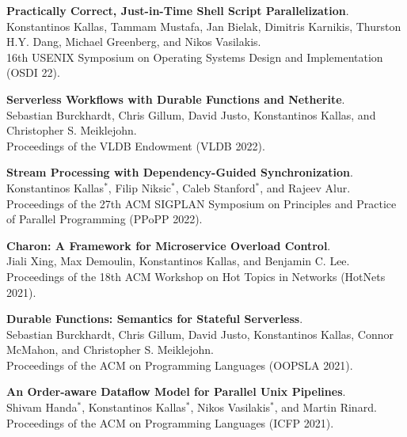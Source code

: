 \begin{minipage}{\textwidth}
\textbf{Practically Correct, Just-in-Time Shell Script Parallelization}. \\
Konstantinos Kallas, Tammam Mustafa, Jan Bielak, Dimitris Karnikis, Thurston H.Y. Dang, Michael Greenberg, and Nikos Vasilakis. \\
16th USENIX Symposium on Operating Systems Design and Implementation (OSDI 22).
\end{minipage}

\begin{minipage}{\textwidth}
\textbf{Serverless Workflows with Durable Functions and Netherite}. \\
Sebastian Burckhardt, Chris Gillum, David Justo, Konstantinos Kallas, and Christopher S. Meiklejohn. \\
Proceedings of the VLDB Endowment (VLDB 2022).
\end{minipage}

\begin{minipage}{\textwidth}
\textbf{Stream Processing with Dependency-Guided Synchronization}. \\
Konstantinos Kallas$^*$, Filip Niksic$^*$, Caleb Stanford$^*$, and Rajeev Alur. \\
Proceedings of the 27th ACM SIGPLAN Symposium on Principles and Practice of Parallel Programming (PPoPP 2022).
\end{minipage}

\begin{minipage}{\textwidth}
\textbf{Charon: A Framework for Microservice Overload Control}. \\
Jiali Xing, Max Demoulin, Konstantinos Kallas, and Benjamin C. Lee. \\
Proceedings of the 18th ACM Workshop on Hot Topics in Networks (HotNets 2021).
\end{minipage}

\begin{minipage}{\textwidth}
\textbf{Durable Functions: Semantics for Stateful Serverless}. \\
Sebastian Burckhardt, Chris Gillum, David Justo, Konstantinos Kallas, Connor McMahon, and Christopher S. Meiklejohn. \\
Proceedings of the ACM on Programming Languages (OOPSLA 2021).
\end{minipage}

\begin{minipage}{\textwidth}
\textbf{An Order-aware Dataflow Model for Parallel Unix Pipelines}. \\
Shivam Handa$^*$, Konstantinos Kallas$^*$, Nikos Vasilakis$^*$, and Martin Rinard. \\
Proceedings of the ACM on Programming Languages (ICFP 2021).
\end{minipage}

